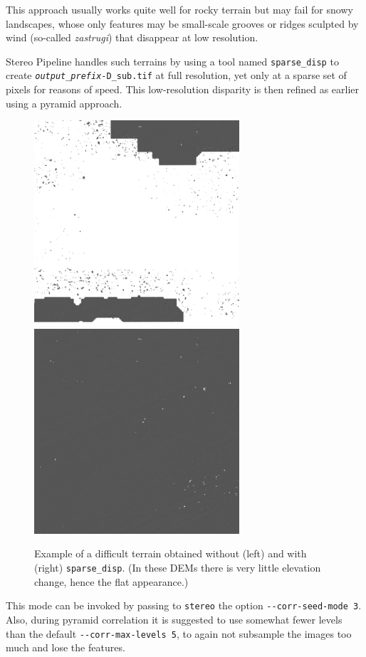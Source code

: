 This approach usually works quite well for rocky terrain but may fail
for snowy landscapes, whose only features may be small-scale
grooves or ridges sculpted by wind (so-called {\it zastrugi}) that
disappear at low resolution.

Stereo Pipeline handles such terrains by using a tool named
\texttt{sparse\_disp} to create
\texttt{\textit{output\_prefix}-D\_sub.tif} at full resolution, yet only
at a sparse set of pixels for reasons of speed. This
low-resolution disparity is then refined as earlier using a pyramid
approach.

\begin{figure}[h!]
\centering
  \includegraphics[width=3.0in]{images/examples/sparse_disp1_400px.png}
  \includegraphics[width=3.0in]{images/examples/sparse_disp3_400px.png}
\caption{Example of a difficult terrain obtained without (left) and with (right) \texttt{sparse\_disp}. (In these DEMs there is very little elevation change, hence the flat appearance.)}
\label{fig:sparse-disp-example}
\end{figure}

This mode can be invoked by passing to \texttt{stereo} the option
\texttt{-\/-corr-seed-mode 3}. Also, during pyramid correlation it is
suggested to use somewhat fewer levels than the default
\texttt{-\/-corr-max-levels 5}, to again not subsample the images too much
and lose the features.

